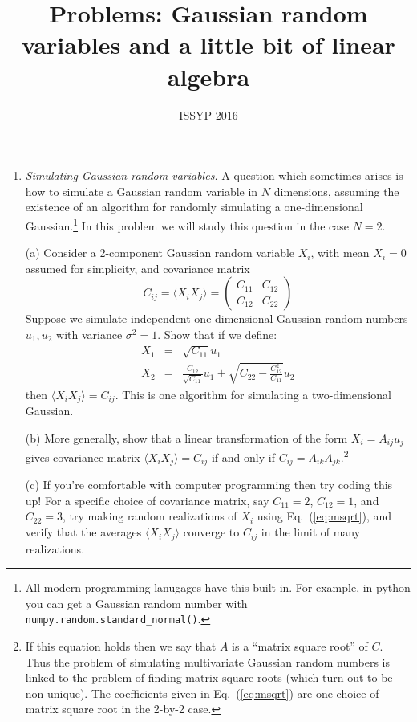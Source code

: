 \documentclass[aps,prd,superscriptaddress,groupedaddress,nofootinbib,nobibnotes]{revtex4}
\newcommand{\be}{\begin{equation}}
\newcommand{\ee}{\end{equation}}
\newcommand{\ba}{\begin{eqnarray}}
\newcommand{\ea}{\end{eqnarray}}
\newcommand{\nn}{\nonumber}
\begin{document}
\title{Problems: Gaussian random variables and a little bit of linear algebra}

\author{ISSYP 2016}


\maketitle

\begin{enumerate}

\item {\em Simulating Gaussian random variables.}
A question which sometimes arises is how to simulate a Gaussian random variable in $N$ dimensions,
assuming the existence of an algorithm for randomly simulating a one-dimensional Gaussian.\footnote{All
modern programming lanugages have this built in.  For example, in python you can get a Gaussian random number
with {\tt numpy.random.standard\_normal()}.}  In this problem we will study this question in the case $N=2$.
\par\medskip
(a) 
Consider a 2-component Gaussian random variable $X_i$, with mean $\bar X_i = 0$ assumed for simplicity,
and covariance matrix
\be
C_{ij} = \langle X_i X_j \rangle = \left( \begin{array}{cc}
 C_{11} & C_{12} \\
 C_{12} & C_{22}
\end{array} \right)
\ee
Suppose we simulate independent one-dimensional Gaussian random numbers $u_1, u_2$ with variance $\sigma^2=1$.
Show that if we define:
\ba
X_1 &=& \sqrt{C_{11}} u_1 \nn \\
X_2 &=& \frac{C_{12}}{\sqrt{C_{11}}} u_1 + \sqrt{ C_{22} - \frac{C_{12}^2}{C_{11}}} u_2  \label{eq:msqrt}
\ea
then $\langle X_i X_j \rangle = C_{ij}$.  This is one algorithm for simulating a two-dimensional Gaussian.
\par\medskip
(b) More generally, show that a linear transformation of the form $X_i = A_{ij} u_j$ gives covariance
matrix $\langle X_i X_j \rangle = C_{ij}$ if and only if $C_{ij} = A_{ik} A_{jk}$.\footnote{If this equation
holds then we say that $A$ is a ``matrix square root'' of $C$.  Thus the problem of simulating multivariate
Gaussian random numbers is linked to the problem of finding matrix square roots (which turn out to be non-unique).  
The coefficients given in Eq.~(\ref{eq:msqrt}) are one choice of matrix square root in the 2-by-2 case.}
\par\medskip
(c) If you're comfortable with computer programming then try coding this up!  For a specific choice of
covariance matrix, say $C_{11}=2$, $C_{12}=1$, and $C_{22}=3$, try making random realizations
of $X_i$ using Eq.~(\ref{eq:msqrt}), and verify that the averages $\langle X_i X_j \rangle$ converge to $C_{ij}$
in the limit of many realizations.


\end{enumerate}
\end{document}
